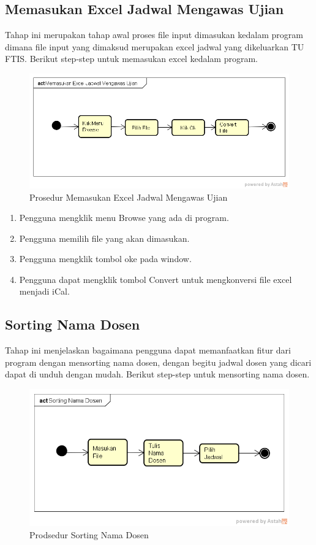 \subsection{Memasukan Excel Jadwal Mengawas Ujian}
Tahap ini merupakan tahap awal proses file input dimasukan kedalam program dimana file input yang dimaksud merupakan excel jadwal yang dikeluarkan TU FTIS. Berikut step-step untuk memasukan excel kedalam program.
\begin{figure}[h]
	\centering
	\includegraphics[scale=0.5]{Gambar/Memasukan-Excel-Jadwal-Mengawas-Ujian}
	\caption{Prosedur Memasukan Excel Jadwal Mengawas Ujian}
	\end{figure}
	
\begin{enumerate}
	\item Pengguna mengklik menu Browse yang ada di program. 
	\item Pengguna memilih file yang akan dimasukan.
	\item Pengguna mengklik tombol oke pada window.
	\item Pengguna dapat mengklik tombol Convert untuk mengkonversi file excel menjadi iCal.
\end{enumerate}

\subsection{Sorting Nama Dosen}
Tahap ini menjelaskan bagaimana pengguna dapat memanfaatkan fitur dari program dengan mensorting nama dosen, dengan begitu jadwal dosen yang dicari dapat di unduh dengan mudah. Berikut step-step untuk mensorting nama dosen.
\begin{figure}[H]
	\centering
	\includegraphics[scale=0.5]{Gambar/Sorting-Nama-Dosen}
	\caption{Prodsedur Sorting Nama Dosen}
	\end{figure}

